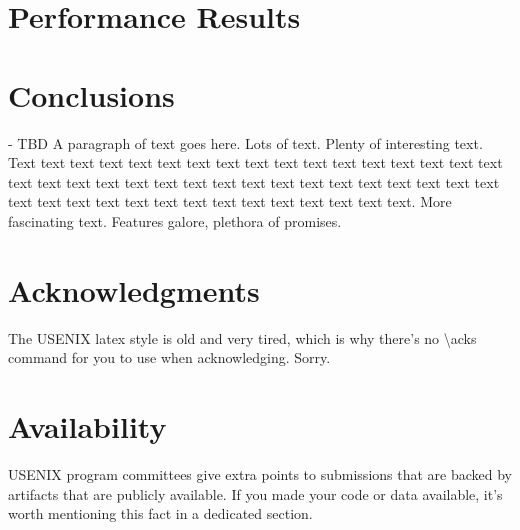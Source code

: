 \section{Performance Results}
\label{sec:perf-results}


\section{Conclusions}
- TBD
A paragraph of text goes here. Lots of text. Plenty of interesting
text. Text text text text text text text text text text text text text
text text text text text text text text text text text text text text
text text text text text text text text text text text text text text
text text text text text text text.
More fascinating text. Features galore, plethora of promises.

\section*{Acknowledgments}
The USENIX latex style is old and very tired, which is why
there's no \textbackslash{}acks command for you to use when
acknowledging. Sorry.

\section*{Availability}

USENIX program committees give extra points to submissions that are
backed by artifacts that are publicly available. If you made your code
or data available, it's worth mentioning this fact in a dedicated
section.

{
   \footnotesize
   
   
}



